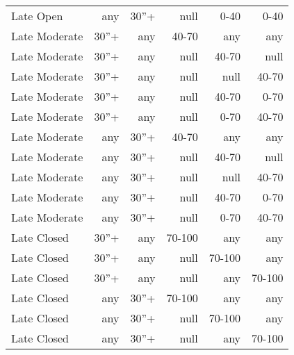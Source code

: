 \begin{table}[]
\begin{tabular}{@{}lrrrrr@{}}
Late Open        & any            & 30''+    & null   & 0-40   & 0-40   \\
Late Moderate    & 30''+           & any     & 40-70  & any    & any    \\
Late Moderate    & 30''+           & any     & null   & 40-70  & null   \\
Late Moderate    & 30''+           & any     & null   & null   & 40-70  \\
Late Moderate    & 30''+           & any     & null   & 40-70  & 0-70   \\
Late Moderate    & 30''+           & any     & null   & 0-70   & 40-70  \\
Late Moderate    & any            & 30''+    & 40-70  & any    & any    \\
Late Moderate    & any            & 30''+    & null   & 40-70  & null   \\
Late Moderate    & any            & 30''+    & null   & null   & 40-70  \\
Late Moderate    & any            & 30''+    & null   & 40-70  & 0-70   \\
Late Moderate    & any            & 30''+    & null   & 0-70   & 40-70  \\
Late Closed      & 30''+           & any     & 70-100 & any    & any    \\
Late Closed      & 30''+           & any     & null   & 70-100 & any    \\
Late Closed      & 30''+           & any     & null   & any    & 70-100 \\
Late Closed      & any            & 30''+    & 70-100 & any    & any    \\
Late Closed      & any            & 30''+    & null   & 70-100 & any    \\
Late Closed      & any            & 30''+    & null   & any    & 70-100 \\ \bottomrule
\end{tabular}
\end{table}



